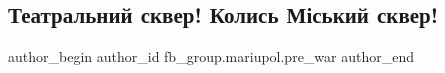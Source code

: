  
 
 
 
 

\subsection{Театральний сквер! Колись Міський сквер!}
\label{sec:14_02_2023.fb.fb_group.mariupol.pre_war.2.teatralnii_skver__ko}

\ifcmt
 author_begin
   author_id fb_group.mariupol.pre_war
 author_end
\fi
